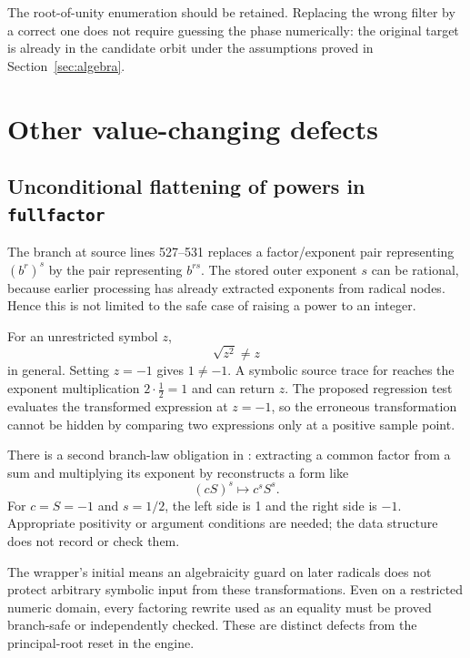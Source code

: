\documentclass[11pt,letterpaper]{article}
\newcommand{\code}[1]{\texttt{\detokenize{#1}}}
\theoremstyle{definition}
\begin{document}
The root-of-unity enumeration should be retained. Replacing the wrong filter by a
correct one does not require guessing the phase numerically: the original target
is already in the candidate orbit under the assumptions proved in
Section~\ref{sec:algebra}.

\section{Other value-changing defects}
\label{sec:othercorrectness}

\subsection{Unconditional flattening of powers in \texttt{fullfactor}}
The branch at source lines 527--531 replaces a factor/exponent pair representing
$(b^r)^s$ by the pair representing $b^{rs}$. The stored outer exponent $s$ can be
rational, because earlier processing has already extracted exponents from radical
nodes. Hence this is not limited to the safe case of raising a power to an integer.

For an unrestricted symbol $z$,
\begin{equation}
 \sqrt{z^2}\ne z
\end{equation}
in general. Setting $z=-1$ gives $1\ne-1$. A symbolic source trace for
\code{Factorc[Sqrt[z^2]]} reaches the exponent multiplication
$2\cdot\tfrac12=1$ and can return $z$. The proposed regression test evaluates the
transformed expression at $z=-1$, so the erroneous transformation cannot be hidden
by comparing two expressions only at a positive sample point.

There is a second branch-law obligation in \code{combine}: extracting a common
factor from a sum and multiplying its exponent by \code{pow} reconstructs a form
like
\begin{equation}
 (cS)^s\longmapsto c^sS^s.
\end{equation}
For $c=S=-1$ and $s=1/2$, the left side is 1 and the right side is $-1$. Appropriate
positivity or argument conditions are needed; the data structure does not record
or check them.

The wrapper's initial \code{Factorc[expr]} means an algebraicity guard on later
radicals does not protect arbitrary symbolic input from these transformations.
Even on a restricted numeric domain, every factoring rewrite used as an equality
must be proved branch-safe or independently checked. These are distinct defects
from the principal-root reset in the engine.
\end{document}
